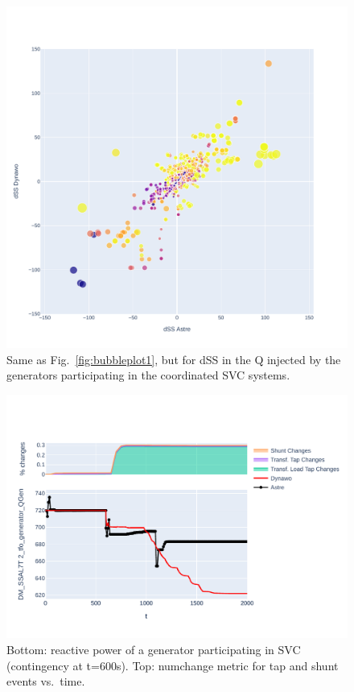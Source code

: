 \documentclass[conference]{IEEEtran}
\begin{document}
\begin{figure}
  \centering
  \includegraphics[width=\columnwidth]{figs/Qgen_dSS_GENS_20210211-0930_moreT600}
  \caption{Same as Fig.~\ref{fig:bubbleplot1}, but for dSS in the Q
    injected by the generators participating in the coordinated
    SVC systems.}
  \label{fig:bubbleplot2}
\end{figure}

\begin{figure}
  \centering
  \includegraphics[width=\columnwidth]{figs/Qgen_curve_GENS_20210211-0930_moreT600}
  \caption{Bottom: reactive power of a generator participating in SVC
    (contingency at t=600s). Top: numchange metric for tap and shunt events
    vs.\ time.}
  \label{fig:curveplot}
\end{figure}
\end{document}

